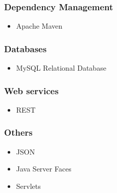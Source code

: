 \documentclass[hidelinks, 12pt, oneside]{article}
\begin{document}
	\subsubsection{Dependency Management}
	\begin{itemize}
	\item Apache Maven
	\end{itemize}
	\subsubsection{Databases}
	\begin{itemize}
	\item MySQL Relational Database
	\end{itemize}
	\subsubsection{Web services}
	\begin{itemize}
	\item REST
	\end{itemize}
	\subsubsection{Others}
	\begin{itemize}
	\item JSON
	\item Java Server Faces
	\item Servlets
	\end{itemize}		
\end{document}
